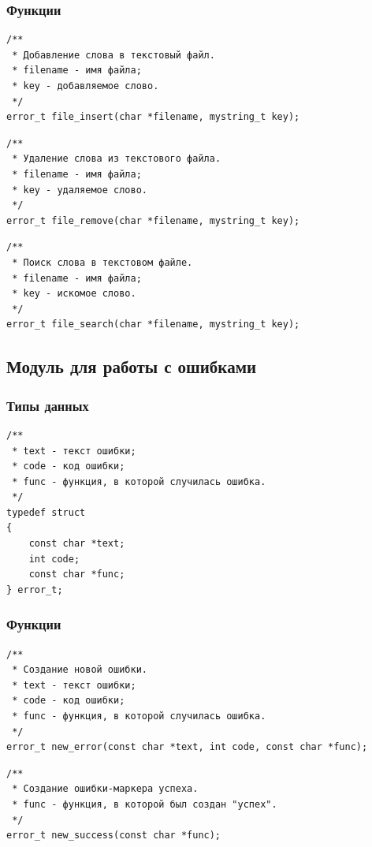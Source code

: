 \documentclass[a4paper,12pt]{extarticle}
\begin{document}
\subsubsection{Функции}

\begin{verbatim}
/**
 * Добавление слова в текстовый файл.
 * filename - имя файла;
 * key - добавляемое слово.
 */
error_t file_insert(char *filename, mystring_t key);
\end{verbatim}

\begin{verbatim}
/**
 * Удаление слова из текстового файла.
 * filename - имя файла;
 * key - удаляемое слово.
 */
error_t file_remove(char *filename, mystring_t key);
\end{verbatim}

\begin{verbatim}
/**
 * Поиск слова в текстовом файле.
 * filename - имя файла;
 * key - искомое слово.
 */
error_t file_search(char *filename, mystring_t key);
\end{verbatim}


\subsection{Модуль для работы с ошибками}
\subsubsection{Типы данных}
\begin{verbatim}
/**
 * text - текст ошибки;
 * code - код ошибки;
 * func - функция, в которой случилась ошибка.
 */
typedef struct 
{
    const char *text;
    int code;
    const char *func;
} error_t;
\end{verbatim}


\subsubsection{Функции}
\begin{verbatim}
/**
 * Создание новой ошибки.
 * text - текст ошибки;
 * code - код ошибки;
 * func - функция, в которой случилась ошибка.
 */
error_t new_error(const char *text, int code, const char *func);
\end{verbatim}


\begin{verbatim}
/**
 * Создание ошибки-маркера успеха.
 * func - функция, в которой был создан "успех".
 */
error_t new_success(const char *func);
\end{verbatim}
\end{document}
